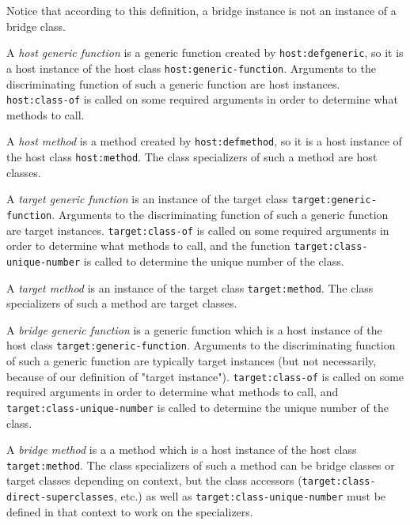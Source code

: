 Notice that according to this definition, a bridge instance is not an
instance of a bridge class.

\begin{definition}
A \emph{host generic function} is a generic function created by
\texttt{host:defgeneric}, so it is a host instance of the host class
\texttt{host:generic-function}.  Arguments to the discriminating
function of such a generic function are host instances.
\texttt{host:class-of} is called on some required arguments in order
to determine what methods to call.
\end{definition}

\begin{definition}
A \emph{host method} is a method created by \texttt{host:defmethod},
so it is a host instance of the host class \texttt{host:method}.  The
class specializers of such a method are host classes.
\end{definition}

\begin{definition}
A \emph{target generic function} is an instance of the target class
\texttt{target:generic-function}.  Arguments to the discriminating
function of such a generic function are target instances.
\texttt{target:class-of} is called on some required arguments in order
to determine what methods to call, and the function
\texttt{target:class-unique-number} is called to determine the unique
number of the class.
\end{definition}

\begin{definition}
A \emph{target method} is an instance of the target class
\texttt{target:method}.  The class specializers of such a method are
target classes.
\end{definition}

\begin{definition}
A \emph{bridge generic function} is a generic function which is a host
instance of the host class \texttt{target:generic-function}.  Arguments to
the discriminating function of such a generic function are
typically target instances (but not necessarily, because of our
definition of "target instance").  \texttt{target:class-of} is called on
some required arguments in order to determine what methods to
call, and \texttt{target:class-unique-number} is called to determine the
unique number of the class.
\end{definition}

\begin{definition}
A \emph{bridge method} is a a method which is a host instance of the host
class \texttt{target:method}.  The class specializers of such a method can
be bridge classes or target classes depending on context, but the
class accessors (\texttt{target:class-direct-superclasses}, etc.) as well
as \texttt{target:class-unique-number} must be defined in that context to
work on the specializers. 
\end{definition}

